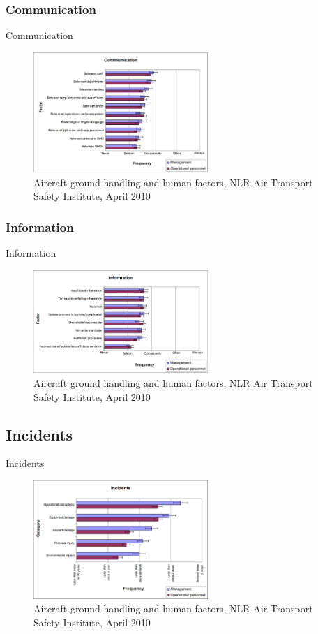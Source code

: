 \subsubsection{Communication}
\begin{frame}{Communication}
	\begin{figure}[H]
		\centering
		\includegraphics[width=250px]{Grafik/CommunicationalFactors}
		\caption{\footnotesize Aircraft ground handling and human factors, NLR Air Transport Safety Institute, April 2010}
	\end{figure}
\end{frame}

\subsubsection{Information}
\begin{frame}{Information}
	\begin{figure}[H]
		\centering
		\includegraphics[width=250px]{Grafik/Information}
		\caption{\footnotesize Aircraft ground handling and human factors, NLR Air Transport Safety Institute, April 2010}
	\end{figure}
\end{frame}

\subsection{Incidents}
\begin{frame}{Incidents}
	\begin{figure}[H]
		\centering
		\includegraphics[width=250px]{Grafik/FrequencyOfIncidents}
		\caption{\footnotesize Aircraft ground handling and human factors, NLR Air Transport Safety Institute, April 2010}
	\end{figure}
\end{frame}

